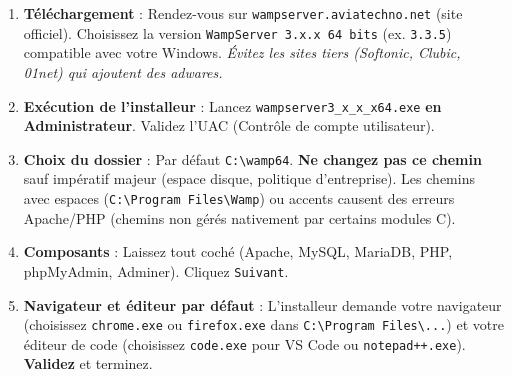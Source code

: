 \documentclass[11pt]{article}
\begin{document}
\begin{methode}
\begin{enumerate}
    \item \textbf{Téléchargement} : Rendez-vous sur \texttt{wampserver.aviatechno.net} (site officiel). Choisissez la version \texttt{WampServer 3.x.x 64 bits} (ex. \texttt{3.3.5}) compatible avec votre Windows. \emph{Évitez les sites tiers (Softonic, Clubic, 01net) qui ajoutent des adwares.}
    \item \textbf{Exécution de l'installeur} : Lancez \texttt{wampserver3\_x\_x\_x64.exe} \textbf{en Administrateur}. Validez l'UAC (Contrôle de compte utilisateur).
    \item \textbf{Choix du dossier} : Par défaut \texttt{C:\textbackslash wamp64}. \textbf{Ne changez pas ce chemin} sauf impératif majeur (espace disque, politique d'entreprise). Les chemins avec espaces (\texttt{C:\textbackslash Program Files\textbackslash Wamp}) ou accents causent des erreurs Apache/PHP (chemins non gérés nativement par certains modules C).
    \item \textbf{Composants} : Laissez tout coché (Apache, MySQL, MariaDB, PHP, phpMyAdmin, Adminer). Cliquez \texttt{Suivant}.
    \item \textbf{Navigateur et éditeur par défaut} : L'installeur demande votre navigateur (choisissez \texttt{chrome.exe} ou \texttt{firefox.exe} dans \texttt{C:\textbackslash Program Files\textbackslash ...}) et votre éditeur de code (choisissez \texttt{code.exe} pour VS Code ou \texttt{notepad++.exe}). \textbf{Validez} et terminez.
\end{enumerate}
\end{methode}
\end{document}
